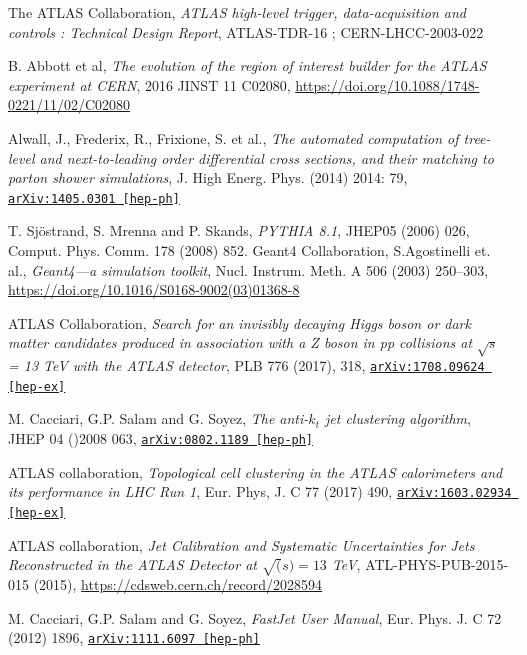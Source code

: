 \documentclass[12pt,a4paper,openright,twoside]{report}
\newcommand{\bibref}[4]{#1, \textit{#2}, #3 #4}
\begin{document}
\begin{thebibliography}{9}
	\bibref{The ATLAS Collaboration}{ATLAS high-level trigger, data-acquisition and controls : Technical Design Report}{ATLAS-TDR-16 ;}{CERN-LHCC-2003-022}

	\bibref{B. Abbott et al}{The evolution of the region of interest builder for the ATLAS experiment at CERN}{2016 JINST 11 C02080,}{\url{https://doi.org/10.1088/1748-0221/11/02/C02080}}

	\bibref{Alwall, J., Frederix, R., Frixione, S. et al.}{The automated computation of tree-level and next-to-leading order differential cross sections, and their matching to parton shower simulations}{J. High Energ. Phys. (2014) 2014: 79,}{\href{https://arxiv.org/abs/1405.0301}{\texttt{arXiv:1405.0301 [hep-ph]}}}

	\bibref{T. Sjöstrand, S. Mrenna and P. Skands}{PYTHIA 8.1}{JHEP05 (2006) 026, Comput. Phys. Comm. 178 (2008) 852.}

	\bibref{Geant4 Collaboration, S.Agostinelli et. al.}{Geant4—a simulation toolkit}{Nucl. Instrum. Meth. A 506 (2003) 250–303,}{\url{https://doi.org/10.1016/S0168-9002(03)01368-8}}

	\bibref{ATLAS Collaboration}{Search for an invisibly decaying Higgs boson or dark matter candidates produced in association with a Z boson in pp collisions at $\sqrt{s}$ = 13 TeV with the ATLAS detector}{PLB 776 (2017), 318,}{\href{https://arxiv.org/abs/1708.09624}{\texttt{arXiv:1708.09624 [hep-ex]}}}
	
	\bibref{M. Cacciari, G.P. Salam and G. Soyez}{The anti-$k_t$ jet clustering algorithm}{JHEP 04 ()2008 063,}{\href{https://arxiv.org/abs/0802.1189}{\texttt{arXiv:0802.1189 [hep-ph]}}}
	
	\bibref{ATLAS collaboration}{Topological cell clustering in the ATLAS calorimeters and its performance in LHC Run 1}{Eur. Phys, J. C 77 (2017) 490,}{\href{https://arxiv.org/abs/1603.02934}{\texttt{arXiv:1603.02934 [hep-ex]}}}
	
	\bibref{ATLAS collaboration}{Jet Calibration and Systematic Uncertainties for Jets Reconstructed in the ATLAS Detector at $\sqrt(s)=13$ TeV}{ATL-PHYS-PUB-2015-015 (2015),}{\url{https://cdsweb.cern.ch/record/2028594}}
	
	\bibref{M. Cacciari, G.P. Salam and G. Soyez}{FastJet User Manual}{Eur. Phys. J. C 72 (2012) 1896,}{\href{https://arxiv.org/abs/1111.6097}{\texttt{arXiv:1111.6097 [hep-ph]}}}
	

\end{thebibliography}
\end{document}
